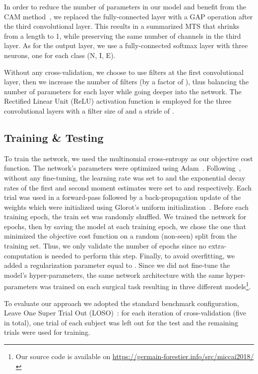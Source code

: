\documentclass{llncs}
\begin{document}
In order to reduce the number of parameters in our model and benefit from the CAM method~\cite{zhou2016learning}, we replaced the fully-connected layer with a GAP operation after the third convolutional layer. 
This results in a summarized MTS that shrinks from a length  to 1, while preserving the same number of channels in the third layer.
As for the output layer, we use a fully-connected softmax layer with three neurons, one for each class (N, I, E).

Without any cross-validation, we choose to use  filters at the first convolutional layer, then we increase the number of filters (by a factor of ), thus balancing the number of parameters for each layer while going deeper into the network. 
The Rectified Linear Unit (ReLU) activation function is employed for the three convolutional layers with a filter size of  and a stride of . 

\subsection{Training \& Testing}
To train the network, we used the multinomial cross-entropy as our objective cost function. 
The network's parameters were optimized using Adam~\cite{kingma2015adam}. 
Following~\cite{wang2017time}, without any fine-tuning, the learning rate was set to  and the exponential decay rates of the first and second moment estimates were set to  and  respectively.
Each trial was used in a forward-pass followed by a back-propagation update of the weights which were initialized using Glorot's uniform initialization~\cite{glorot2010understanding}.
Before each training epoch, the train set was randomly shuffled.
We trained the network for  epochs, then by saving the model at each training epoch, we chose the one that minimized the objective cost function on a random (non-seen) split from the training set.
Thus, we only validate the number of epochs since no extra-computation is needed to perform this step. 
Finally, to avoid overfitting, we added a  regularization parameter equal to . 
  Since we did not fine-tune the model's hyper-parameters, the same network architecture with the same hyper-parameters was trained on each surgical task resulting in three different models\footnote{\scriptsize Our source code is available on \url{https://germain-forestier.info/src/miccai2018/}}.

To evaluate our approach we adopted the standard benchmark configuration, Leave One Super Trial Out (LOSO)~\cite{ahmidi2017a}: for each iteration of cross-validation (five in total), one trial of each subject was left out for the test and the remaining trials were used for training.
\end{document}
